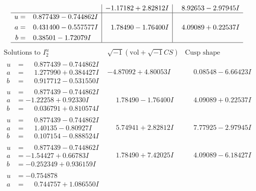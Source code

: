 \documentclass[1p]{elsarticle_modified}
\theoremstyle{definition}
\newcommand{\I}{\sqrt{-1}}
\begin{document}
$$\begin{array}{c|c|c}
 & -1.17182 + 2.82812 I & \phantom{-}8.92653 - 2.97945 I \\ \hline\begin{aligned}
u &= \phantom{-}0.877439 - 0.744862 I \\
a &= \phantom{-}0.431400 - 0.557577 I \\
b &= \phantom{-}0.38501 - 1.72079 I\end{aligned}
 & \phantom{-}1.78490 - 1.76400 I & \phantom{-}4.09089 + 0.22537 I\\
 \hline 
 \end{array}$$\newpage$$\begin{array}{c|c|c}  
\text{Solutions to }I^u_{2}& \I (\text{vol} + \sqrt{-1}CS) & \text{Cusp shape}\\
 \hline 
\begin{aligned}
u &= \phantom{-}0.877439 - 0.744862 I \\
a &= \phantom{-}1.277990 + 0.384427 I \\
b &= \phantom{-}0.917712 - 0.531550 I\end{aligned}
 & -4.87092 + 4.80053 I & \phantom{-}0.08548 - 6.66423 I \\ \hline\begin{aligned}
u &= \phantom{-}0.877439 - 0.744862 I \\
a &= -1.22258 + 0.92330 I \\
b &= \phantom{-}0.036791 + 0.810574 I\end{aligned}
 & \phantom{-}1.78490 - 1.76400 I & \phantom{-}4.09089 + 0.22537 I \\ \hline\begin{aligned}
u &= \phantom{-}0.877439 - 0.744862 I \\
a &= \phantom{-}1.40135 - 0.80927 I \\
b &= \phantom{-}0.107154 - 0.888524 I\end{aligned}
 & \phantom{-}5.74941 + 2.82812 I & \phantom{-}7.77925 - 2.97945 I \\ \hline\begin{aligned}
u &= \phantom{-}0.877439 - 0.744862 I \\
a &= -1.54427 + 0.66783 I \\
b &= -0.252349 + 0.936159 I\end{aligned}
 & \phantom{-}1.78490 + 7.42025 I & \phantom{-}4.09089 - 6.18427 I \\ \hline\begin{aligned}
u &= -0.754878\phantom{ +0.000000I} \\
a &= \phantom{-}0.744757 + 1.086550 I \\

\end{aligned}
\end{array}$$
\end{document}
